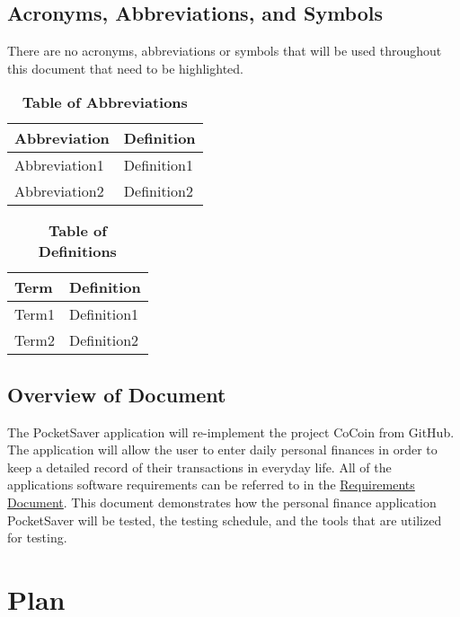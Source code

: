 \documentclass[12pt, titlepage]{article}
\begin{document}
\subsection{Acronyms, Abbreviations, and Symbols}
There are no acronyms, abbreviations or symbols that will be used throughout this document that need to be highlighted. 
	
\begin{table}[hbp]
\caption{\textbf{Table of Abbreviations}} \label{Table}

\begin{tabularx}{\textwidth}{p{3cm}X}
\toprule
\textbf{Abbreviation} & \textbf{Definition} \\
\midrule
Abbreviation1 & Definition1\\
Abbreviation2 & Definition2\\
\bottomrule
\end{tabularx}

\end{table}

\begin{table}[!htbp]
\caption{\textbf{Table of Definitions}} \label{Table}

\begin{tabularx}{\textwidth}{p{3cm}X}
\toprule
\textbf{Term} & \textbf{Definition}\\
\midrule
Term1 & Definition1\\
Term2 & Definition2\\
\bottomrule
\end{tabularx}

\end{table}	

\subsection{Overview of Document}
The PocketSaver application will re-implement the project CoCoin from GitHub. The application will allow the user to enter daily personal finances in order to keep a detailed record of their transactions in everyday life. All of the applications software requirements can be referred to in the \href{run:../SRS/SRS.pdf}{Requirements Document}. This document demonstrates how the personal finance application PocketSaver will be tested, the testing schedule, and the tools that are utilized for testing.

\section{Plan}
	
\end{document}

